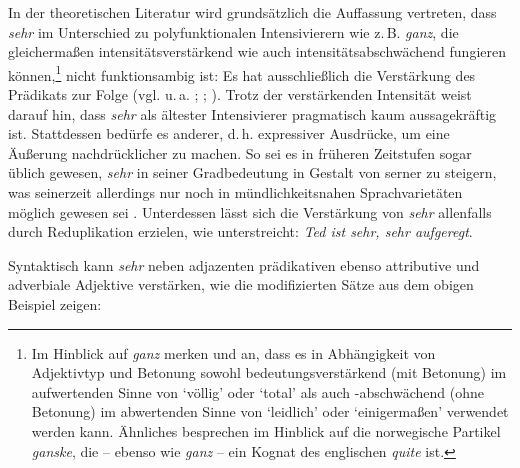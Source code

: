 In der theoretischen Literatur wird grundsätzlich die Auffassung vertreten, dass \textit{sehr} im Unterschied zu polyfunktionalen Intensivierern wie z.\,B. \textit{ganz}, die gleichermaßen intensitätsverstärkend wie auch intensitätsabschwächend fungieren können,\footnote{Im Hinblick auf \textit{ganz} merken \citet[31]{Pusch.1981} und \citet[136f.]{Os.1989} an, dass es in Abhängigkeit von Adjektivtyp und Betonung sowohl bedeutungsverstärkend (mit Betonung) im aufwertenden Sinne von `völlig' oder `total' als auch -abschwächend (ohne Betonung) im abwertenden Sinne von `leidlich' oder `einigermaßen' verwendet werden kann. Ähnliches besprechen \citet[400]{Stratton.2022} im Hinblick auf die norwegische Partikel \textit{ganske}, die -- ebenso wie \textit{ganz} -- ein Kognat des englischen \textit{quite} ist.} nicht funktionsambig ist: Es hat ausschließlich die Verstärkung des Prädikats zur Folge (vgl. u.\,a. \citealt[31]{Pusch.1981}; {\citealt[194]{Os.1989}}; \citealt[589]{Duden.2016}). Trotz der verstärkenden Intensität weist {\citet[7]{Mueller.1899}} darauf hin, dass \textit{sehr} als ältester Intensivierer pragmatisch kaum aussagekräftig ist. Stattdessen bedürfe es anderer, d.\,h. expressiver Ausdrücke, um eine Äußerung nachdrücklicher zu machen. So sei es in früheren Zeitstufen sogar üblich gewesen, \textit{sehr} in seiner Gradbedeutung in Gestalt von \glqq{}serner\grqq{} zu steigern, was seinerzeit allerdings nur noch in mündlichkeitsnahen Sprachvarietäten möglich gewesen sei \citep[vgl.][7]{Mueller.1899}. Unterdessen lässt sich die Verstärkung von \textit{sehr} allenfalls durch Reduplikation erzielen, wie \citet[191]{Staffeldt.2018} unterstreicht: \textit{Ted ist sehr, sehr aufgeregt}.


Syntaktisch kann \textit{sehr} neben adjazenten prädikativen  ebenso {attributive } und adverbiale Adjektive  verstärken, wie die modifizierten Sätze aus dem obigen Beispiel  zeigen:

